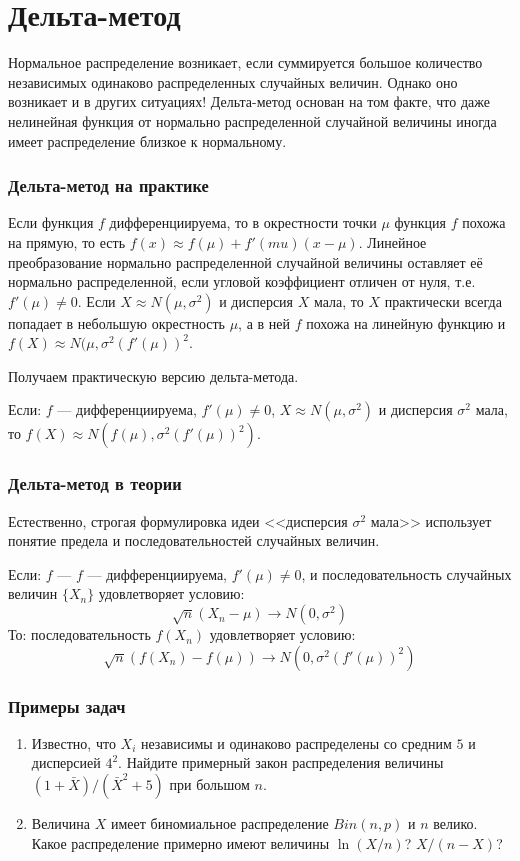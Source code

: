 \documentclass[12pt,a4paper]{article}
\begin{document}
\section*{Дельта-метод}

Нормальное распределение возникает, если суммируется большое количество независимых одинаково распределенных случайных величин. Однако оно возникает и в других ситуациях! Дельта-метод основан на том факте, что даже нелинейная функция от нормально распределенной случайной величины  иногда имеет распределение близкое к нормальному.


\subsubsection*{Дельта-метод на практике}

Если функция $f$ дифференциируема, то в окрестности точки $\mu$ функция $f$ похожа на прямую, то есть $f(x)\approx f(\mu) + f'(mu)(x-\mu)$. Линейное преобразование нормально распределенной случайной величины оставляет её нормально распределенной, если угловой коэффициент отличен от нуля, т.е. $f'(\mu) \neq 0$. Если $X\approx N(\mu,\sigma^2)$ и  дисперсия $X$ мала, то $X$ практически всегда попадает в небольшую окрестность $\mu$, а в ней $f$ похожа на линейную функцию и $f(X) \approx N(\mu, \sigma^2 (f'(\mu))^2$. 

Получаем практическую версию дельта-метода.

Если: $f$ --- дифференциируема, $f'(\mu)\neq 0$, $X\approx N(\mu,\sigma^2)$ и дисперсия $\sigma^2$ мала, то $f(X) \approx N(f(\mu),\sigma^2 (f'(\mu))^2)$.


\subsubsection*{Дельта-метод в теории}

Естественно, строгая формулировка идеи <<дисперсия $\sigma^2$ мала>> использует понятие предела и последовательностей случайных величин.

Если: $f$ --- $f$ --- дифференциируема, $f'(\mu)\neq 0$, и последовательность случайных величин $\{X_n\}$ удовлетворяет условию:
\[
\sqrt{n} (X_n - \mu) \to N(0,\sigma^2)
\]
То: последовательность $f(X_n)$ удовлетворяет условию:
\[
\sqrt{n} (f(X_n) - f(\mu)) \to N(0,\sigma^2 (f'(\mu))^2 )
\]



\subsubsection*{Примеры задач}

\begin{enumerate}
\item Известно, что $X_i$ независимы и одинаково распределены со средним $5$ и дисперсией $4^2$. Найдите примерный закон распределения величины $(1+\bar{X})/(\bar{X}^2+5)$ при большом $n$.

\item Величина $X$ имеет биномиальное распределение $Bin(n,p)$ и $n$ велико. Какое распределение примерно имеют величины $\ln(X/n)$? $X/(n-X)$?
\end{enumerate}
\end{document}
